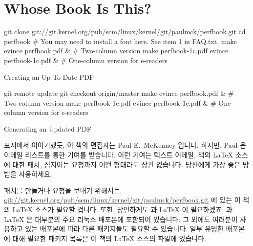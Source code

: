 \section{Whose Book Is This?}
\label{sec:howto:Whose Book Is This?}

\begin{listing*}[tbp]
\begin{VerbatimL}
git clone git://git.kernel.org/pub/scm/linux/kernel/git/paulmck/perfbook.git
cd perfbook
# You may need to install a font here. See item 1 in FAQ.txt.
make
evince perfbook.pdf & # Two-column version
make perfbook-1c.pdf
evince perfbook-1c.pdf & # One-column version for e-readers
\end{VerbatimL}
\caption{Creating an Up-To-Date PDF}
\label{lst:howto:Creating a Up-To-Date PDF}
\end{listing*}

\begin{listing*}[tbp]
\begin{VerbatimL}
git remote update
git checkout origin/master
make
evince perfbook.pdf & # Two-column version
make perfbook-1c.pdf
evince perfbook-1c.pdf & # One-column version for e-readers
\end{VerbatimL}
\caption{Generating an Updated PDF}
\label{lst:howto:Generating an Updated PDF}
\end{listing*}

표지에서 이야기했듯, 이 책의 편집자는 Paul E.~McKenney 입니다.
하지만, Paul 은  이메일 리스트를 통한 기여를
받습니다.
이런 기여는 텍스트 이메일, 책의 \LaTeX{} 소스에 대한 패치, 심지어는  요청까지 어떤 형태라도 상관 없습니다.
당신에게 가장 좋은 방법을 사용하세요.
\iffalse

As the cover says, the editor is one Paul E.~McKenney.
However, the editor does accept contributions via the
\href{mailto:perfbook@vger.kernel.org}
{\nolinkurl{perfbook@vger.kernel.org}} email list.
These contributions can be in pretty much any form, with popular
approaches including text emails,
patches against the book's \LaTeX{} source, and even \co{git pull} requests.
Use whatever form works best for you.
\fi

패치를 만들거나  요청을 보내기 위해서는,
\url{git://git.kernel.org/pub/scm/linux/kernel/git/paulmck/perfbook.git} 에
있는 이 책의 \LaTeX{} 소스가 필요할 겁니다.
또한, 당연하게도  과 \LaTeX{} 이 필요하겠죠.  과 \LaTeX{} 은
대부분의 주요 리눅스 배포본에 포함되어 있습니다.
그 외에도 여러분이 사용하고 있는 배포본에 따라 다른 패키지들도 필요할 수
있습니다.
일부 유명한 배포본에 대해 필요한 패키지 목록은 이 책의 \LaTeX{} 소스의
 파일에 있습니다.
\iffalse

